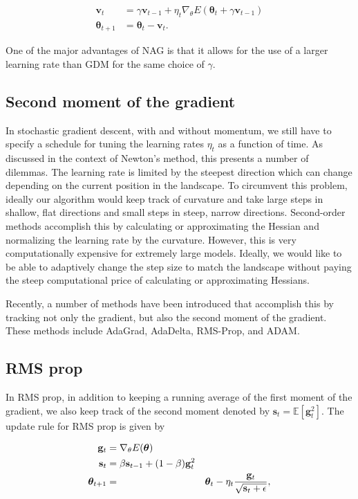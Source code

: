 \documentclass[%
oneside,                 %
final,                   %
10pt]{article}
\begin{document}
\begin{align}
\mathbf{v}_{t}&=\gamma \mathbf{v}_{t-1}+\eta_{t}\nabla_\theta E(\boldsymbol{\theta}_t +\gamma \mathbf{v}_{t-1}) \nonumber \\
\boldsymbol{\theta}_{t+1}&= \boldsymbol{\theta}_t -\mathbf{v}_{t}.
\end{align}

One of the major advantages of NAG is that it allows for the use of a larger learning rate than GDM for the same choice of $\gamma$.


\subsection*{Second moment of the gradient}


In stochastic gradient descent, with and without momentum, we still
have to specify a schedule for tuning the learning rates $\eta_t$
as a function of time.  As discussed in the context of Newton's
method, this presents a number of dilemmas. The learning rate is
limited by the steepest direction which can change depending on the
current position in the landscape. To circumvent this problem, ideally
our algorithm would keep track of curvature and take large steps in
shallow, flat directions and small steps in steep, narrow directions.
Second-order methods accomplish this by calculating or approximating
the Hessian and normalizing the learning rate by the
curvature. However, this is very computationally expensive for
extremely large models. Ideally, we would like to be able to
adaptively change the step size to match the landscape without paying
the steep computational price of calculating or approximating
Hessians.

Recently, a number of methods have been introduced that accomplish
this by tracking not only the gradient, but also the second moment of
the gradient. These methods include AdaGrad, AdaDelta, RMS-Prop, and
ADAM.

\subsection*{RMS prop}

In RMS prop, in addition to keeping a running average of the first
moment of the gradient, we also keep track of the second moment
denoted by $\mathbf{s}_t=\mathbb{E}[\mathbf{g}_t^2]$. The update rule
for RMS prop is given by

\begin{align}
\mathbf{g}_t &= \nabla_\theta E(\boldsymbol{\theta}) \\
\mathbf{s}_t &=\beta \mathbf{s}_{t-1} +(1-\beta)\mathbf{g}_t^2 \nonumber \\
\boldsymbol{\theta}_{t+1}&=&\boldsymbol{\theta}_t - \eta_t { \mathbf{g}_t \over \sqrt{\mathbf{s}_t +\epsilon}}, \nonumber
\end{align}
\end{document}
